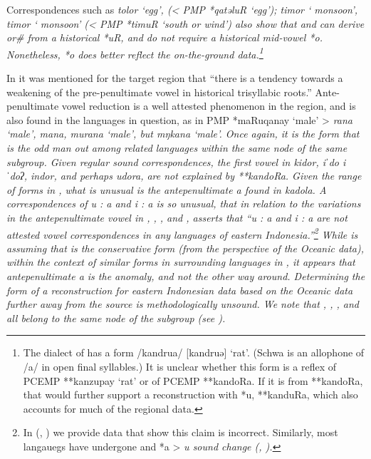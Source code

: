 Correspondences such as  \it{tolor} ‘egg’,
(< PMP *qatəluR ‘egg’);  \it{timor} ‘ monsoon’,
 \it{timor} ‘ monsoon’ (< PMP *timuR ‘south or 
wind’) also show that 
and  can derive \it{or{\#}} from a historical *uR,
and do not require a historical mid-vowel *o.
Nonetheless, *o does better reflect the on-the-ground data.\footnote{
		The  dialect of  has a form /kandrua/ [kandruə] ‘rat’.
		(Schwa is an allophone of /a/ in open final syllables.) It is
		unclear whether this form is a reflex of PCEMP **kanzupay ‘rat’
		or of PCEMP **kandoRa.
		If it is from **kandoRa,
		that would further support a reconstruction with *u,
		**kanduRa, which also accounts for much of the regional data.}

In  it was mentioned for the target region that “there
is a tendency towards a weakening of the pre-penultimate vowel
in historical trisyllabic roots.” Ante-penultimate vowel reduction
is a well attested phenomenon in the region,
and is also found in the languages in question,
as in PMP *maRuqanay ‘male’ >  \it{rana} ‘male’,
 \it{mana, murana} ‘male’,
but  \it{mŋkana} ‘male’.
Once again, it is the  form that is the odd man out among
related languages within the same node of the same subgroup.
Given regular sound correspondences,
the first vowel in  \it{kidor},
 \it{iˈdo {\tl} iˈdoʔ},
 \it{indor}, and perhaps  \it{udora},
are not explained by **kandoRa.
Given the range of forms in ,
what is unusual is the antepenultimate \it{a} found in  \it{kadola}.
A correspondences of \it{u : a}
and \it{i : a} is so unusual,
that in relation to the variations in the antepenultimate vowel
in , , , and , \citet[268,
footnote 6]{Blust2012b} asserts that “\it{u : a}
and \it{i : a} are not attested vowel correspondences in any
languages of eastern Indonesia.”\footnote{
		In  (, )
		we provide data that show this claim is incorrect.
		Similarly, most  langauegs have undergone
		and *a > \it{u} sound change (, ).}
While \citeauthor{Blust2012b}
is assuming that  is the conservative form (from the
perspective of the Oceanic data),
within the context of similar forms in surrounding languages
in , it appears that  antepenultimate \it{a} is the anomaly,
and not the other way around.
Determining the form of a reconstruction for eastern Indonesian
data based on the Oceanic data further away from the source is methodologically unsound.
We note that ,
, ,  and  all belong to the same  node of the  subgroup (see ).

